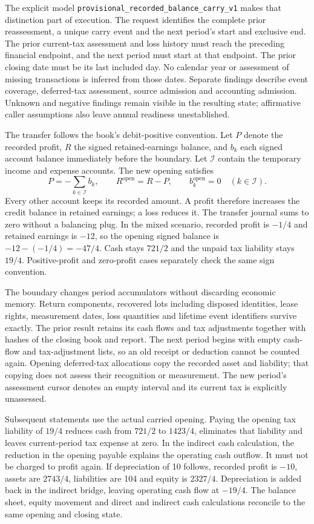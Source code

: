 The explicit model \texttt{provisional\_recorded\_balance\_carry\_v1} makes
that distinction part of execution. The request identifies the complete prior
reassessment, a unique carry event and the next period's start and exclusive
end. The prior current-tax assessment and loss history must reach the preceding
financial endpoint, and the next period must start at that endpoint. The prior
closing date must be its last included day. No calendar year or assessment of
missing transactions is inferred from those dates. Separate findings describe
event coverage, deferred-tax assessment, source admission and accounting
admission. Unknown and negative findings remain visible in the resulting state;
affirmative caller assumptions also leave annual readiness unestablished.

The transfer follows the book's debit-positive convention. Let $P$ denote the
recorded profit, $R$ the signed retained-earnings balance, and $b_k$ each
signed account balance immediately before the boundary. Let $\mathcal I$
contain the temporary income and expense accounts. The new opening satisfies
\[
 P=-\sum_{k\in\mathcal I}b_k,\qquad
 R^{\mathrm{open}}=R-P,\qquad
 b_k^{\mathrm{open}}=0\quad(k\in\mathcal I).
\]
Every other account keeps its recorded amount. A profit therefore increases the
credit balance in retained earnings; a loss reduces it. The transfer journal
sums to zero without a balancing plug. In the mixed scenario, recorded profit
is $-1/4$ and retained earnings is $-12$, so the opening signed balance is
$-12-(-1/4)=-47/4$. Cash stays $721/2$ and the unpaid tax liability stays
$19/4$. Positive-profit and zero-profit cases separately check the same sign
convention.

The boundary changes period accumulators without discarding economic memory.
Return components, recovered lots including disposed identities, lease rights,
measurement dates, loss quantities and lifetime event identifiers survive
exactly. The prior result retains its cash flows and tax adjustments together
with hashes of the closing book and report. The next period begins with empty
cash-flow and tax-adjustment lists, so an old receipt or deduction cannot be
counted again. Opening deferred-tax allocations copy the recorded asset and
liability; that copying does not assess their recognition or measurement. The
new period's assessment cursor denotes an empty interval and its current tax is
explicitly unassessed.

Subsequent statements use the actual carried opening. Paying the opening tax
liability of $19/4$ reduces cash from $721/2$ to $1423/4$, eliminates that
liability and leaves current-period tax expense at zero. In the indirect cash
calculation, the reduction in the opening payable explains the operating cash
outflow. It must not be charged to profit again. If depreciation of 10 follows,
recorded profit is $-10$, assets are $2743/4$, liabilities are 104 and equity is
$2327/4$. Depreciation is added back in the indirect bridge, leaving operating
cash flow at $-19/4$. The balance sheet, equity movement and direct and indirect
cash calculations reconcile to the same opening and closing state.

